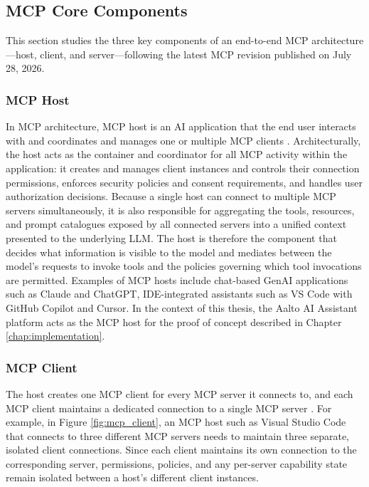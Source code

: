 \documentclass[english, 12pt, a4paper, elec, utf8, a-2b, online]{aaltothesis}
\newcommand{\aitutor}{\text{AI Tutor}\xspace}
\begin{document}
\subsection{MCP Core Components}
\label{sec:mcp_components}
This section studies the three key components of an end-to-end MCP architecture—host, client, and server—following the latest MCP revision published on July 28, 2026. 

\subsubsection{MCP Host}
In MCP architecture, MCP host is an AI application that the end user interacts with and coordinates and manages one or multiple MCP clients \cite{mcpspec2026}.
Architecturally, the host acts as the container and coordinator for all MCP activity within the application: it creates and manages client instances and controls their connection permissions, enforces security policies
and consent requirements, and handles user authorization decisions.
Because a single host can connect to multiple MCP servers simultaneously, it is also responsible for aggregating the tools, resources, and prompt catalogues exposed by all connected servers into a unified context presented to the underlying LLM.
The host is therefore the component that decides what information is visible to the model and mediates between the model's requests to invoke tools and the policies governing which tool invocations are permitted.
Examples of MCP hosts include chat-based GenAI applications such as Claude and ChatGPT, IDE-integrated assistants such as VS Code with GitHub Copilot and Cursor. 
In the context of this thesis, the Aalto AI Assistant platform \cite{aalto_ai_assistant} acts as the MCP host for the \aitutor proof of concept described in Chapter \ref{chap:implementation}. 

\subsubsection{MCP Client}
\label{sec:mcp-client}
The host creates one MCP client for every MCP server it connects to, and each MCP client maintains a dedicated connection to a single MCP server \cite{mcpspec2026}. 
For example, in Figure \ref{fig:mcp_client}, an MCP host such as Visual Studio Code that connects to three different MCP servers needs to maintain three separate, isolated client connections. 
Since each client maintains its own connection to the corresponding server, permissions, policies, and any
per-server capability state remain isolated between a host's different client instances.
\end{document}

